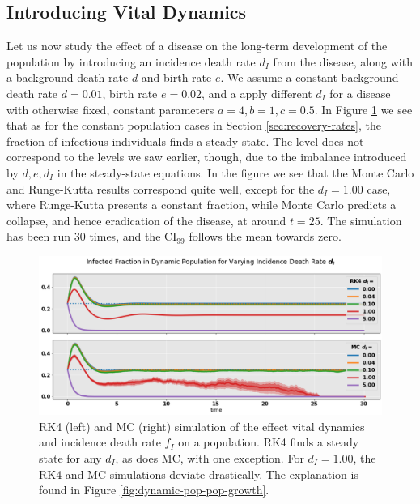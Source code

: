 \documentclass[]{article}
\begin{document}
\subsection{Introducing Vital Dynamics} \label{sec:vital-dynamics}

Let us now study the effect of a disease on the long-term development of the population by introducing an incidence death rate $d_I$ from the disease, along with a background death rate $d$ and birth rate $e$. We assume a constant background death rate $d=0.01$, birth rate $e=0.02$, and a apply different $d_I$ for a disease with otherwise fixed, constant parameters $a=4, b=1, c=0.5$. In Figure \ref{fig:dynamic-pop-infected-ratio} we see that as for the constant population cases in Section \ref{sec:recovery-rates}, the fraction of infectious individuals finds a steady state. The level does not correspond to the levels we saw earlier, though, due to the imbalance introduced by $d, e, d_I$ in the steady-state equations. In the figure we see that the Monte Carlo and Runge-Kutta results correspond quite well, except for the $d_I = 1.00$ case, where Runge-Kutta presents a constant fraction, while Monte Carlo predicts a collapse, and hence eradication of the disease, at around $t=25$. The simulation has been run 30 times, and the CI$_{99}$ follows the mean towards zero.





\begin{figure}[!h]
	\centering
	\includegraphics[width=1\linewidth]{./figs/dynamic-pop-infected-ratio.png}
	\caption{RK4 (left) and MC (right) simulation of the effect vital dynamics and incidence death rate $f_I$ on a population. RK4 finds a steady state for any $d_I$, as does MC, with one exception. For $d_I = 1.00$, the RK4 and MC simulations deviate drastically. The explanation is found in Figure \ref{fig:dynamic-pop-pop-growth}.}
	\label{fig:dynamic-pop-infected-ratio}
\end{figure}
\end{document}

